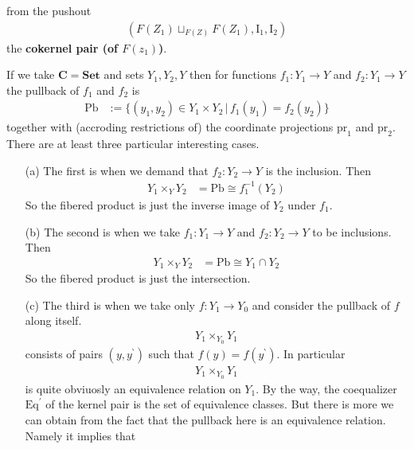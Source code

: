 \begin{exa}
\begin{enumerate}
\begin{enumerate}
from the pushout
\begin{align*}
  \left(
    F(Z_{1})
    \sqcup_{F(Z)}
    F(Z_{1}),
    \mathrm{I}_{1},
    \mathrm{I}_{2}
  \right)
\end{align*}
the \textbf{cokernel pair (of $F(z_{1})$)}.
\end{enumerate}
If we take $\mathbf{C} = \mathbf{Set}$ and sets $Y_{1},Y_{2},Y$ then for functions $f_{1} \colon Y_{1} \rightarrow Y$ and $f_{2} \colon Y_{1} \rightarrow Y$ the pullback of $f_{1}$ and $f_{2}$ is
\begin{align*}
  \mathrm{Pb}
  &:=
  \lbrace
      (y_{1},y_{2})
      \in
      Y_{1}
      \times
      Y_{2}
    \,
    \vert
    \,
      f_{1}(y_{1})
      =
      f_{2}(y_{2})
  \rbrace
\end{align*}
together with (accroding restrictions of) the coordinate projections $\mathrm{pr}_{1}$ and $\mathrm{pr}_{2}$. There are at least three particular interesting cases.
\begin{enumerate}
\item[(a)]
The first is when we demand that $f_{2} \colon Y_{2} \rightarrow Y$ is the inclusion. Then
\begin{align*}
  Y_{1}
  \times_{Y}
  Y_{2}
  &=
  \mathrm{Pb}
  \cong
  f_{1}^{-1}(Y_{2})
\end{align*}
So the fibered product is just the inverse image of $Y_{2}$ under $f_{1}$.
\item[(b)]
The second is when we take $f_{1} \colon Y_{1} \rightarrow Y$ and $f_{2} \colon Y_{2} \rightarrow Y$ to be inclusions. Then
\begin{align*}
  Y_{1}
  \times_{Y}
  Y_{2}
  &=
  \mathrm{Pb}
  \cong
  Y_{1}
  \cap
  Y_{2}
\end{align*}
So the fibered product is just the intersection.
\item[(c)]
The third is when we take only $f \colon Y_{1} \rightarrow Y_{0}$ and consider the pullback of $f$ along itself.
\begin{align*}
  Y_{1}
  \times_{Y_{0}}
  Y_{1}
\end{align*}
consists of pairs $(y,y^{\backprime})$ such that $f(y) = f(y^{\backprime})$. In particular
\begin{align*}
  Y_{1}
  \times_{Y_{0}}
  Y_{1}
\end{align*}
is quite obviuosly an equivalence relation on $Y_{1}$. By the way, the coequalizer $\mathrm{Eq}^{\prime}$ of the kernel pair is the set of equivalence classes. But there is more we can obtain from the fact that the pullback here is an equivalence relation. Namely it implies that

\end{enumerate}
\end{enumerate}
\end{exa}
